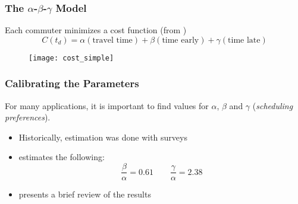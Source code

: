 \documentclass[hyperref={pdfpagelabels=false}]{beamer}
\begin{document}
\begin{frame}
  \frametitle{The \(\alpha\)-\(\beta\)-\(\gamma\) Model}
  Each commuter minimizes a cost function (from \cite{d0907f84-e14a-3d98-ad20-759f41491d6e})
  \begin{equation*}
    C(t_d) = \alpha(\text{travel time}) + \beta (\text{time early}) + \gamma (\text{time late})
  \end{equation*}
  \begin{figure}
    \centering
    \texttt{[image: cost\_simple]}
  \end{figure}
\end{frame}

\begin{frame}
  \frametitle{Calibrating the Parameters}
  For many applications, it is important to find values for \(\alpha\), \(\beta\) and \(\gamma\) (\textit{scheduling preferences}).
  \begin{itemize}
  \item<2-> Historically, estimation was done with surveys
  \item<3-> \textcite{54d203ee-4bf8-3234-9286-56e4c8b7f5bd} estimates the following:
    \begin{equation*}
      \frac{\beta}{\alpha} = 0.61\qquad \frac{\gamma}{\alpha} = 2.38
    \end{equation*}
  \item<4-> \textcite{https://doi.org/10.1111/iere.12692} presents a brief review of the results
  \end{itemize}
\end{frame}
\end{document}
